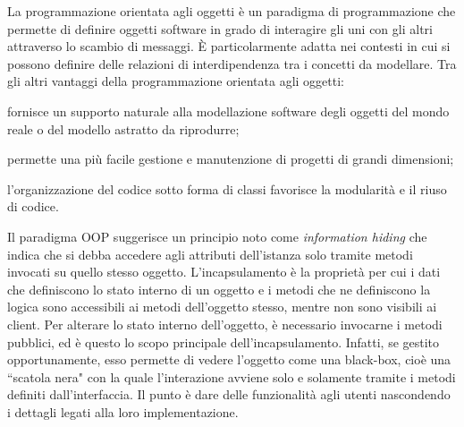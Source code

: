 La programmazione orientata agli oggetti è un paradigma di
programmazione che permette di definire oggetti software in grado di interagire
gli uni con gli altri attraverso lo scambio di messaggi. È particolarmente
adatta nei contesti in cui si possono definire delle relazioni di interdipendenza
tra i concetti da modellare.
Tra gli altri vantaggi della programmazione orientata agli oggetti:
\begin{enumerate*}[label={\alph*)},font={\bfseries}]
\item fornisce un supporto naturale alla modellazione software degli oggetti del
mondo reale o del modello astratto da riprodurre;
\item permette una più facile gestione e manutenzione di progetti di grandi
dimensioni;
\item l'organizzazione del codice sotto forma di classi favorisce la modularità
e il riuso di codice.
\end{enumerate*}
Il paradigma OOP suggerisce un principio noto come \emph{information hiding} che
indica che si debba accedere agli attributi dell'istanza solo tramite metodi
invocati su quello stesso oggetto.
L'incapsulamento è la proprietà per cui i dati che definiscono lo stato interno
di un oggetto e i metodi che ne definiscono la logica sono accessibili ai metodi
dell'oggetto stesso, mentre non sono visibili ai client. Per alterare lo stato
interno dell'oggetto, è necessario invocarne i metodi pubblici, ed è questo lo
scopo principale dell'incapsulamento. Infatti, se gestito opportunamente, esso
permette di vedere l'oggetto come una black-box, cioè una ``scatola nera" con la
quale l'interazione avviene solo e solamente tramite i metodi definiti
dall'interfaccia.
Il punto è dare delle funzionalità agli utenti nascondendo i dettagli legati
alla loro implementazione.\cite{cox1991object}
